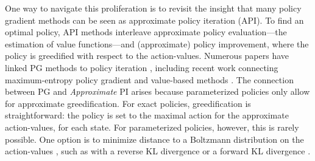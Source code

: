 \documentclass{article}
\begin{document}
One way to navigate this proliferation is to revisit the insight that many policy gradient methods can be seen as approximate policy iteration (API). To find an optimal policy, API methods \citep{bertsekas2011approximate,scherrer2014approximate} interleave approximate policy evaluation---the estimation of value functions---and (approximate) policy improvement, where the policy is greedified with respect to the action-values. Numerous papers have linked PG methods to policy iteration \citep{sutton2000policy,kakade2002approximately,perkins2002existence,perkins2003convergent,wagner2011reinterpretation,wagner2013optimistic,scherrer2014local,bhandari2019global}, including recent work connecting maximum-entropy policy gradient and value-based methods \citep{o2016combining,nachum2017bridging, schulman2017equivalence, nachum2019algaedice}.
The connection between PG and \emph{Approximate} PI arises because parameterized policies only allow for approximate greedification. For exact policies, greedification is straightforward: the policy is set to the maximal action for the approximate action-values, for each state. 
For parameterized policies, however, this is rarely possible. One option is to minimize distance to a Boltzmann distribution on the action-values \citep{wagner2011reinterpretation}, such as with a reverse KL divergence \citep{haarnoja2018soft} or a forward KL divergence \citep{vieillard2019deep}.
 
\end{document}
